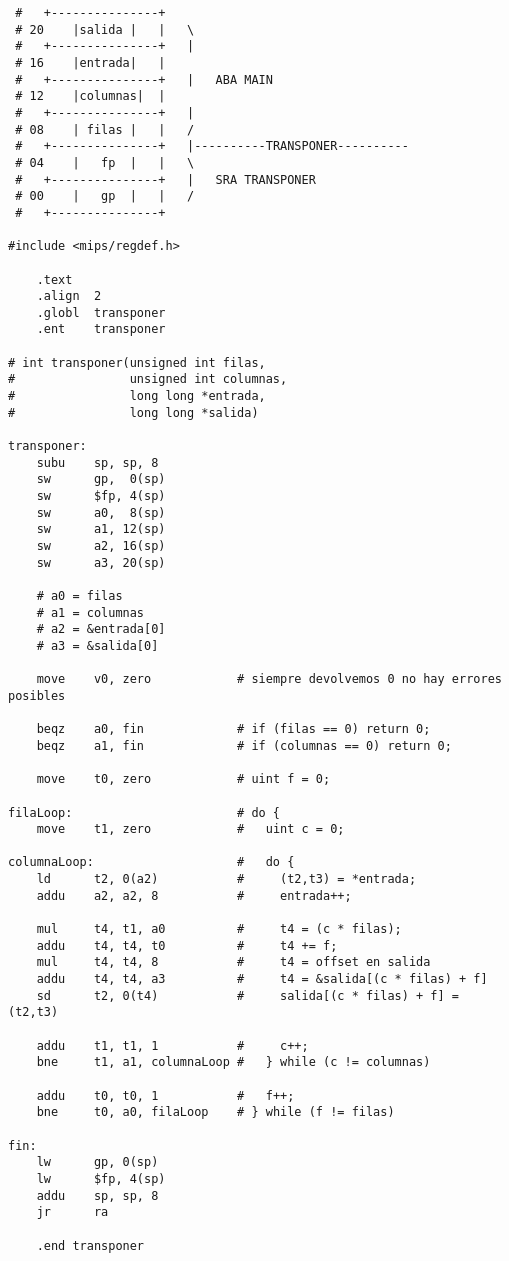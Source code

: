 \documentclass[a4paper]{article}
\begin{document}
\begin{verbatim}
 #   +---------------+
 # 20    |salida |   |   \
 #   +---------------+   |
 # 16    |entrada|   |
 #   +---------------+   |   ABA MAIN
 # 12    |columnas|  |
 #   +---------------+   |
 # 08    | filas |   |   /
 #   +---------------+   |----------TRANSPONER----------
 # 04    |   fp  |   |   \
 #   +---------------+   |   SRA TRANSPONER
 # 00    |   gp  |   |   /
 #   +---------------+

#include <mips/regdef.h>

    .text
    .align  2
    .globl  transponer
    .ent    transponer

# int transponer(unsigned int filas,
#                unsigned int columnas,
#                long long *entrada,
#                long long *salida)

transponer:
    subu    sp, sp, 8
    sw      gp,  0(sp)
    sw      $fp, 4(sp)
    sw      a0,  8(sp)
    sw      a1, 12(sp)
    sw      a2, 16(sp)
    sw      a3, 20(sp)

    # a0 = filas
    # a1 = columnas
    # a2 = &entrada[0]
    # a3 = &salida[0]

    move    v0, zero            # siempre devolvemos 0 no hay errores posibles

    beqz    a0, fin             # if (filas == 0) return 0;
    beqz    a1, fin             # if (columnas == 0) return 0;

    move    t0, zero            # uint f = 0;

filaLoop:                       # do {
    move    t1, zero            #   uint c = 0;

columnaLoop:                    #   do {
    ld      t2, 0(a2)           #     (t2,t3) = *entrada;
    addu    a2, a2, 8           #     entrada++;

    mul     t4, t1, a0          #     t4 = (c * filas);
    addu    t4, t4, t0          #     t4 += f;
    mul     t4, t4, 8           #     t4 = offset en salida
    addu    t4, t4, a3          #     t4 = &salida[(c * filas) + f]
    sd      t2, 0(t4)           #     salida[(c * filas) + f] = (t2,t3)

    addu    t1, t1, 1           #     c++;
    bne     t1, a1, columnaLoop #   } while (c != columnas)

    addu    t0, t0, 1           #   f++;
    bne     t0, a0, filaLoop    # } while (f != filas)

fin:
    lw      gp, 0(sp)
    lw      $fp, 4(sp)
    addu    sp, sp, 8
    jr      ra

    .end transponer
\end{verbatim}
\end{document}
